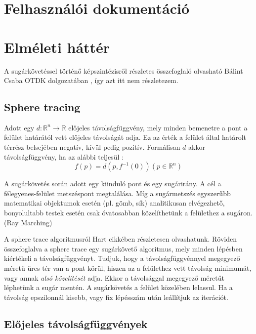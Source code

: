 \chapter{Felhasználói dokumentáció}
\label{ch:user}




\chapter{Elméleti háttér}

A sugárkövetéssel történő képszintézisről részletes összefoglaló olvasható Bálint Csaba OTDK dolgozatában \cite[11-16. o.]{BalintCsaba}, így azt itt nem részletezem.

\section{Sphere tracing}

Adott egy $d:\mathbb{R}^n\rightarrow\mathbb{R}$ előjeles távolságfüggvény, mely minden bemenetre a pont a felület határától vett előjeles távolságát adja. Ez az érték a felület által határolt térrész belsejében negatív, kívül pedig pozitív. Formálisan $d$ akkor távolságfüggvény, ha az alábbi teljesül \cite{Hart1996}:
$$f(p) = d(p, f^{-1}(0)) (p \in \mathbb{R}^n)$$

A sugárkövetés során adott egy kiinduló pont és egy sugárirány. A cél a félegyenes-felület metszéspont megtalálása. Míg a sugármetszés egyszerűbb matematikai objektumok esetén (pl. gömb, sík) analitikusan elvégezhető, bonyolultabb testek esetén csak óvatosabban közelíthetünk a felülethez a sugáron. (Ray Marching\cite{RayMarching})

A sphere trace algoritmusról Hart cikkében \cite{Hart1996} részletesen olvashatunk. Röviden összefoglalva a sphere trace egy sugárkövető algoritmus, mely minden lépésben kiértékeli a távolságfüggvényt. Tudjuk, hogy a távolságfüggvénnyel megegyező méretű üres tér van a pont körül, hiszen az a felülethez vett távolság minimumát, vagy annak \emph{alsó közelítését} adja. Ekkor a távolsággal megegyező méretűt léphetünk a sugár mentén. A sugárkövetés a felület közelében lelassul. Ha a távolság epszilonnál kisebb, vagy fix lépésszám után leállítjuk az iterációt.  


\section{Előjeles távolságfüggvények}


